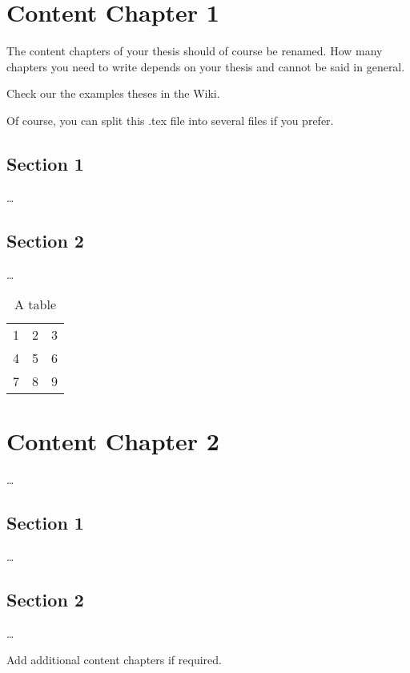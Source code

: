 
\chapter{Content Chapter 1}
\label{ch:Content1}

The content chapters of your thesis should of course be renamed. How many chapters you need to write depends on your thesis and cannot be said in general. 

Check our the examples theses in the Wiki. 

Of course, you can split this .tex file into several files if you prefer. 


\section{Section 1}
\label{ch:Content1:sec:Section1}

\dots


\section{Section 2}
\label{ch:Content1:sec:Section2}

\dots

\begin{table}
\begin{center}
\begin{tabular}{lll}
1 & 2 & 3\\
4 & 5 & 6\\
7 & 8 & 9
\end{tabular}
\end{center}
\caption{A table}
\end{table}






\chapter{Content Chapter 2}
\label{ch:Content2}

\dots


\section{Section 1}
\label{ch:Content2:sec:Section1}

\dots


\section{Section 2}
\label{ch:Content2:sec:Section2}

\dots

Add additional content chapters if required. 